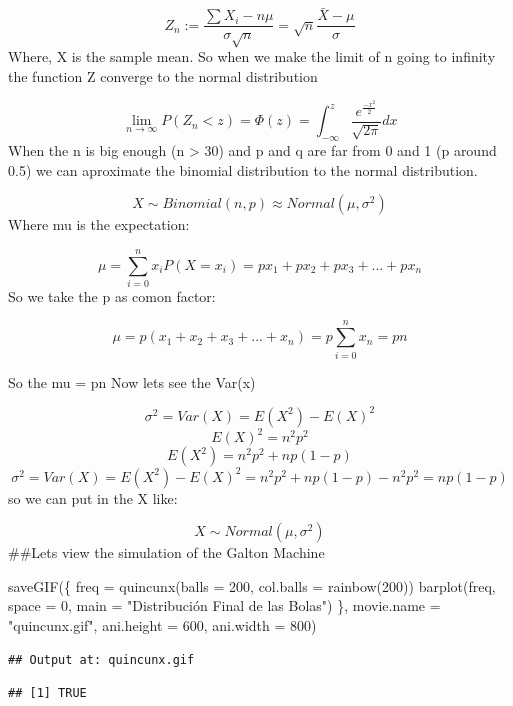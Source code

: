 \documentclass[
]{article}
\newenvironment{Shaded}{\begin{snugshade}}{\end{snugshade}}
\newcommand{\AttributeTok}[1]{\textcolor[rgb]{0.77,0.63,0.00}{#1}}
\newcommand{\DecValTok}[1]{\textcolor[rgb]{0.00,0.00,0.81}{#1}}
\newcommand{\FunctionTok}[1]{\textcolor[rgb]{0.00,0.00,0.00}{#1}}
\newcommand{\NormalTok}[1]{#1}
\newcommand{\OtherTok}[1]{\textcolor[rgb]{0.56,0.35,0.01}{#1}}
\newcommand{\StringTok}[1]{\textcolor[rgb]{0.31,0.60,0.02}{#1}}
\begin{document}
\[ Z_{n} :=\frac{\sum X_i - n \mu}{\sigma \sqrt{n}} = \sqrt{n}\frac{\bar X - \mu}{\sigma}\]
Where, X is the sample mean. So when we make the limit of n going to
infinity the function Z converge to the normal distribution

\[\lim_{n \to \infty} P(Z_n < z) = \Phi(z) = \int_{-\infty}^{z} \frac{e^\frac{-x^2}{2}}{\sqrt{2\pi}}dx\]
When the n is big enough (n \textgreater{} 30) and p and q are far from
0 and 1 (p around 0.5) we can aproximate the binomial distribution to
the normal distribution.

\[X ∼ Binomial(n,p) \approx Normal(\mu, \sigma^2)\] Where mu is the
expectation:

\[\mu = \sum_{i=0}^{n} x_i P(X=x_i) = px_1+ px_2+px_3+...+px_n\] So we
take the p as comon factor:

\[ \mu = p(x_1+ x_2+x_3+...+x_n) =p \sum_{i=0}^{n} x_n = pn\]

So the mu = pn Now lets see the Var(x)

\[\sigma^2 = Var(X) = E(X^2) - E(X)^2\] \[E(X)^2 = n^2p^2\]
\[E(X^2) =  n^2p^2 +np(1-p)\]
\[\sigma^2 = Var(X) = E(X^2) - E(X)^2 =  n^2p^2 +np(1-p) - n^2p^2 = np(1-p)\]
so we can put in the X like:

\[X ∼ Normal(\mu, \sigma^2)\] \#\#Lets view the simulation of the Galton
Machine

\begin{Shaded}
\begin{Highlighting}[]
\FunctionTok{saveGIF}\NormalTok{(\{}
\NormalTok{  freq }\OtherTok{=} \FunctionTok{quincunx}\NormalTok{(}\AttributeTok{balls =} \DecValTok{200}\NormalTok{, }\AttributeTok{col.balls =} \FunctionTok{rainbow}\NormalTok{(}\DecValTok{200}\NormalTok{))}
  \FunctionTok{barplot}\NormalTok{(freq, }\AttributeTok{space =} \DecValTok{0}\NormalTok{, }\AttributeTok{main =} \StringTok{"Distribución Final de las Bolas"}\NormalTok{)}
\NormalTok{\}, }\AttributeTok{movie.name =} \StringTok{"quincunx.gif"}\NormalTok{, }\AttributeTok{ani.height =} \DecValTok{600}\NormalTok{, }\AttributeTok{ani.width =} \DecValTok{800}\NormalTok{)}
\end{Highlighting}
\end{Shaded}

\begin{verbatim}
## Output at: quincunx.gif
\end{verbatim}

\begin{verbatim}
## [1] TRUE
\end{verbatim}
\end{document}
